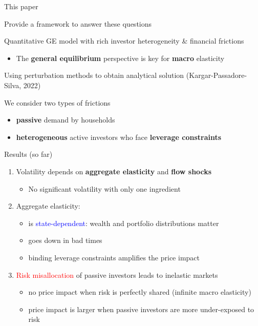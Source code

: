 \begin{frame}{This paper}
    \begin{wideitemize}
        \item Provide a framework to answer these questions
        \item Quantitative GE model with rich investor heterogeneity \& financial frictions
		\begin{itemize}
        \item The \textbf{general equilibrium} perspective is key for \textbf{macro} elasticity\vspM
		\end{itemize}

        \item Using perturbation methods to obtain analytical solution {\scriptsize(Kargar-Passadore-Silva, 2022)}
        \item We consider two types of frictions\vspM
        \begin{itemize}
            \item \textbf{passive} demand by households\vspM
            \item \textbf{heterogeneous} active investors who face \textbf{leverage constraints}
        \end{itemize}
    \end{wideitemize}
\end{frame}

\begin{frame}{Results {\normalsize (so far)}}
   \begin{enumerate}
       \item Volatility depends on \textbf{aggregate elasticity} and \textbf{flow shocks}
		\begin{itemize}
			\item No significant volatility with only one ingredient\vspM\vspM\vspM\vspM
		\end{itemize}

       \item Aggregate elasticity:\vspM
\begin{itemize}
	\item is \textcolor{blue}{state-dependent}: wealth and portfolio distributions matter\vspM
	\item goes down in bad times\vspM
	\item binding leverage constraints amplifies the price impact\vspM\vspM\vspM\vspM
\end{itemize}

   	\item \textcolor{red}{Risk misallocation} of passive investors leads to inelastic markets\vspM
\begin{itemize}
	\item no price impact when risk is perfectly shared (infinite macro elasticity)
	\item price impact is larger when passive investors are more  under-exposed to risk
\end{itemize}



   \end{enumerate} 
\end{frame}

